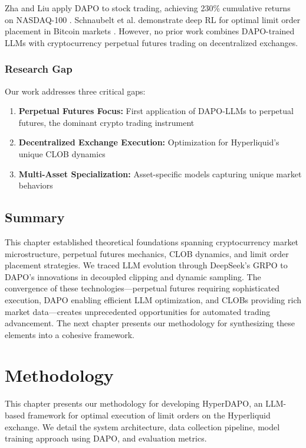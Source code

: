 \documentclass{report}
\begin{document}
Zha and Liu apply DAPO to stock trading, achieving 230\% cumulative returns on NASDAQ-100 \cite{Zha2025}. Schnaubelt et al. demonstrate deep RL for optimal limit order placement in Bitcoin markets \cite{Schnaubelt2022}. However, no prior work combines DAPO-trained LLMs with cryptocurrency perpetual futures trading on decentralized exchanges.

\subsection{Research Gap}

Our work addresses three critical gaps:
\begin{enumerate}
\item \textbf{Perpetual Futures Focus:} First application of DAPO-LLMs to perpetual futures, the dominant crypto trading instrument
\item \textbf{Decentralized Exchange Execution:} Optimization for Hyperliquid's unique CLOB dynamics
\item \textbf{Multi-Asset Specialization:} Asset-specific models capturing unique market behaviors
\end{enumerate}

\section{Summary}

This chapter established theoretical foundations spanning cryptocurrency market microstructure, perpetual futures mechanics, CLOB dynamics, and limit order placement strategies. We traced LLM evolution through DeepSeek's GRPO to DAPO's innovations in decoupled clipping and dynamic sampling. The convergence of these technologies—perpetual futures requiring sophisticated execution, DAPO enabling efficient LLM optimization, and CLOBs providing rich market data—creates unprecedented opportunities for automated trading advancement. The next chapter presents our methodology for synthesizing these elements into a cohesive framework.
\chapter{Methodology}

This chapter presents our methodology for developing HyperDAPO, an LLM-based framework for optimal execution of limit orders on the Hyperliquid exchange. We detail the system architecture, data collection pipeline, model training approach using DAPO, and evaluation metrics.
\end{document}
